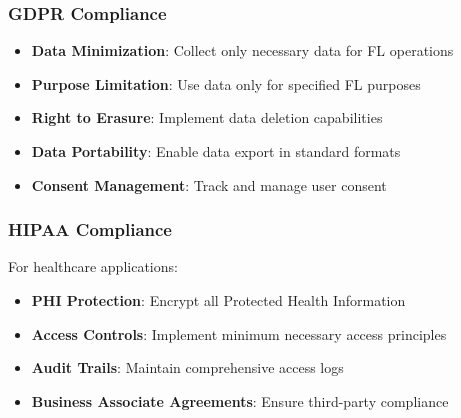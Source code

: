 \subsubsection{GDPR Compliance}
\begin{itemize}
    \item \textbf{Data Minimization}: Collect only necessary data for FL operations
    \item \textbf{Purpose Limitation}: Use data only for specified FL purposes
    \item \textbf{Right to Erasure}: Implement data deletion capabilities
    \item \textbf{Data Portability}: Enable data export in standard formats
    \item \textbf{Consent Management}: Track and manage user consent
\end{itemize}

\subsubsection{HIPAA Compliance}
For healthcare applications:
\begin{itemize}
    \item \textbf{PHI Protection}: Encrypt all Protected Health Information
    \item \textbf{Access Controls}: Implement minimum necessary access principles
    \item \textbf{Audit Trails}: Maintain comprehensive access logs
    \item \textbf{Business Associate Agreements}: Ensure third-party compliance
\end{itemize}


